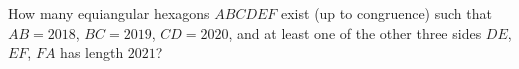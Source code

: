 How many equiangular hexagons $ABCDEF$ exist (up to congruence) such that $AB=2018$, $BC=2019$, $CD=2020$, and at least one of the other three sides $DE$, $EF$, $FA$ has length $2021$?
